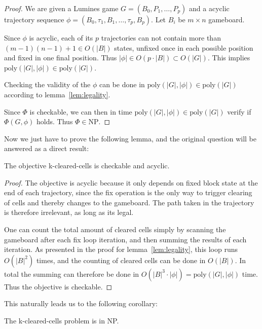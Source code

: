 \begin{proof}
We are given a Lumines game $G = (B_0, P_1, \ldots, P_p)$ and a acyclic trajectory sequence $\phi = (B_0, \tau_1, B_1, \ldots ,\tau_p, B_p)$. Let $B_i$ be $m \times n$ gameboard.

Since $\phi$ is acyclic, each of its $p$ trajectories can not contain more than $(m-1)(n-1) + 1 \in O(|B|)$ states, unfixed once in each possible position and fixed in one final position. Thus $|\phi| \in O(p \cdot |B|) \subset O(|G|)$. This implies $\text{poly}(|G|, |\phi|) \in \text{poly}(|G|)$.

Checking the validity of the $\phi$ can be done in $\text{poly}(|G|, |\phi|) \in \text{poly}(|G|)$ according to lemma~\ref{lem:legality}.

Since $\Phi$ is checkable, we can then in time $\text{poly}(|G|, |\phi|) \in \text{poly}(|G|)$ verify if $\Phi(G, \phi)$ holds. Thus $\Phi \in \text{NP}$.
\end{proof}

Now we just have to prove the following lemma, and the original question will be answered as a direct result:\\

\begin{lem}
The objective k-cleared-cells is checkable and acyclic.
\end{lem}

\begin{proof}
The objective is acyclic because it only depends on fixed block state at the end of each trajectory, since the fix operation is the only way to trigger clearing of cells and thereby changes to the gameboard. The path taken in the trajectory is therefore irrelevant, as long as its legal. 

One can count the total amount of cleared cells simply by scanning the gameboard after each fix loop iteration, and then summing the results of each iteration. As presented in the proof for lemma~\ref{lem:legality}, this loop runs $O(|B|^2)$ times, and the counting of cleared cells can be done in $O(|B|)$. In total the summing can therefore be done in $O(|B|^3 \cdot |\phi|) = \text{poly}(|G|, |\phi|)$ time. Thus the objective is checkable.
\end{proof}

This naturally leads us to the following corollary:\\

\begin{cor}
The k-cleared-cells problem is in NP.
\end{cor}
